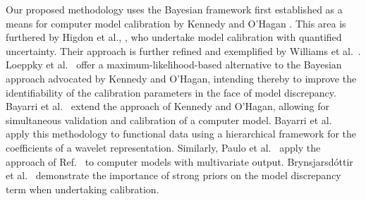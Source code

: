 \documentclass[twocolumn,10pt]{asme2ej}
\begin{document}
%
Our proposed methodology uses the Bayesian framework first established as a means for computer model calibration by Kennedy and O'Hagan \cite{Kennedy2001}.
% 
This area is furthered by Higdon et al., \cite{Higdon2004}, who undertake model calibration with quantified uncertainty. 
%
%
Their approach is further refined and exemplified by Williams et al.\ \cite{Williams2006}.
%
Loeppky et al.\ \cite{Loeppky2006} offer a maximum-likelihood-based alternative to the Bayesian approach advocated by Kennedy and O'Hagan, intending thereby to improve the identifiability of the calibration parameters in the face of model discrepancy. 
%
Bayarri et al.\ \cite{Bayarri2007} extend the approach of Kennedy and O'Hagan, allowing for simultaneous validation and calibration of a computer model. %
%
Bayarri et al.\ \cite{Bayarri} apply this methodology to functional data using a hierarchical framework for the coefficients of a wavelet representation. 
%
Similarly, Paulo et al.\ \cite{Paulo2012} apply the approach of Ref.\ \cite{Bayarri2007} to computer models with multivariate output.
%
Brynsjarsd\'ottir et al.\ \cite{Brynjarsdottir2014} demonstrate the importance of strong priors on the model discrepancy term when undertaking calibration.
%
\end{document}
